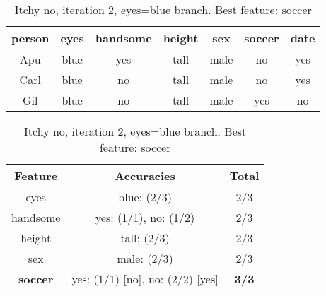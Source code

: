 \begin{table}[h!]
  \centering
  \begin{tabular}{cccccc|c}
    \toprule
    person      & eyes  & handsome & height & sex    & soccer & date\\
    \midrule
    Apu         & blue  & yes      & tall   & male   & no     & yes \\
    Carl        & blue  & no       & tall   & male   & no     & yes \\
    Gil         & blue  & no       & tall   & male   & yes    & no  \\
    \bottomrule
  \end{tabular}

  \vspace{.5cm}

  \begin{tabular}{ccc}
    \toprule
    Feature         & Accuracies                              & Total\\
    \midrule
    eyes            & blue: (2/3)                             & 2/3\\
    handsome        & yes: (1/1), no: (1/2)                   & 2/3\\
    height          & tall: (2/3)                             & 2/3\\
    sex             & male: (2/3)                             & 2/3\\
    \textbf{soccer} & yes: (1/1) [no], no: (2/2) [yes]        & \textbf{3/3}\\
    \bottomrule
  \end{tabular}
  \caption*{Itchy no, iteration 2, eyes=blue branch. Best feature: soccer}
\end{table}

